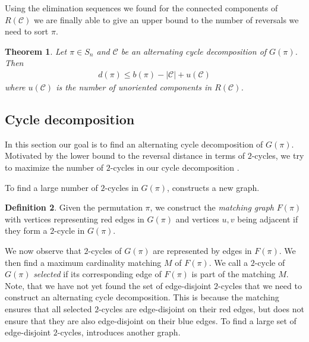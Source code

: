 \documentclass[11pt,DIV=11]{scrartcl}
\newtheorem{theorem}{Theorem}[section]
\theoremstyle{definition}
\newtheorem{definition}[theorem]{Definition}
\theoremstyle{remark}
\begin{document}
Using the elimination sequences we found for the connected components of $R(\mathcal{C})$ we are finally able to give an upper bound to the number of reversals we need to sort $\pi$.

\begin{theorem}
\label{thm:4}
Let $\pi \in S_n$ and $\mathcal{C}$ be an alternating cycle decomposition of $G(\pi)$. Then
\begin{align*}
    d(\pi) \leq b(\pi) - |\mathcal{C}| + u(\mathcal{C})
\end{align*}
where $u(\mathcal{C})$ is the number of unoriented components in $R(\mathcal{C})$.
\end{theorem}

\subsection{Cycle decomposition}
\label{sec:cycle_decomposition}

In this section our goal is to find an alternating cycle decomposition of $G(\pi)$. Motivated by the lower bound to the reversal distance in terms of $2$-cycles, we try to maximize the number of $2$-cycles in our cycle decomposition \cite{Christie1998}.

To find a large number of $2$-cycles in $G(\pi)$, \citeauthor*{Christie1998} constructs a new graph.

\begin{definition}
Given the permutation $\pi$, we construct the \textit{matching graph} $F(\pi)$ with vertices representing red edges in $G(\pi)$ and vertices $u, v$ being adjacent if they form a $2$-cycle in $G(\pi)$.
\end{definition}

We now observe that $2$-cycles of $G(\pi)$ are represented by edges in $F(\pi)$. We then find a maximum cardinality matching $M$ of $F(\pi)$. We call a $2$-cycle of $G(\pi)$ \textit{selected} if its corresponding edge of $F(\pi)$ is part of the matching $M$. Note, that we have not yet found the set of edge-disjoint $2$-cycles that we need to construct an alternating cycle decomposition. This is because the matching ensures that all selected $2$-cycles are edge-disjoint on their red edges, but does not ensure that they are also edge-disjoint on their blue edges. To find a large set of edge-disjoint $2$-cycles, \citeauthor*{Christie1998} introduces another graph.
\end{document}
